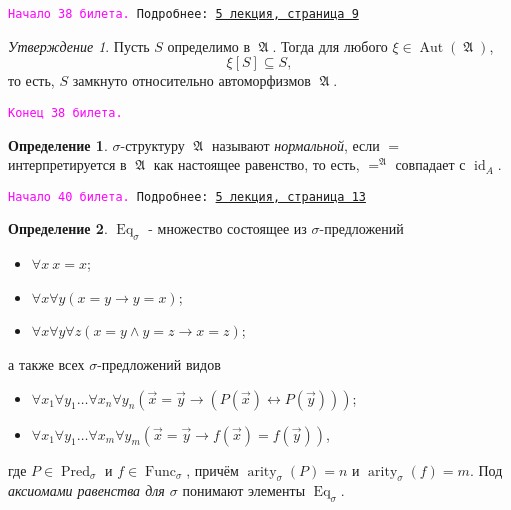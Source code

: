 \documentclass[a4paper,100pt]{article}
\theoremstyle{indented}
\theoremstyle{definition}
\newtheorem{defn}{Определение}
\theoremstyle{remark}
\newtheorem{stat}{Утверждение}
\DeclareMathOperator{\ra}{\rightarrow}
\DeclareMathOperator{\id}{id}
\DeclareMathOperator{\Pred}{Pred}
\DeclareMathOperator{\Func}{Func}
\DeclareMathOperator{\arity}{arity}
\DeclareMathOperator{\Aut}{Aut}
\DeclareMathOperator{\Eq}{Eq}
\DeclareMathOperator{\GA}{\mathfrak{A}}
\begin{document}
\hrulefill

\texttt{\hypertarget{b38}{\textcolor{magenta}{Начало 38 билета.}} Подробнее: \href{http://www.mi-ras.ru/~speranski/courses/logic-1-2021-spring/slides_5.pdf}{5 лекция, страница 9}} 

\begin{stat}
  Пусть $S$ определимо в $\GA$. Тогда для любого $\xi\in \Aut(\GA)$, 
  \[
    \xi[S]\subseteq S, 
  \]
  то есть, $S$ замкнуто относительно автоморфизмов $\GA$. 
\end{stat}

\texttt{\textcolor{magenta}{Конец 38 билета.}} 

\hrulefill

\begin{defn}
  $\sigma$-структуру $\GA$ называют \textit{нормальной}, если $=$ интерпретируется в $\GA$ как настоящее равенство, то есть, $=^{\GA}$ совпадает с $\id_A$.
\end{defn}

\hrulefill

\texttt{\hypertarget{b40}{\textcolor{magenta}{Начало 40 билета.}} Подробнее: \href{http://www.mi-ras.ru/~speranski/courses/logic-1-2021-spring/slides_5.pdf}{5 лекция, страница 13}} 

\begin{defn}
  $\Eq_\sigma$ - множество состоящее из $\sigma$-предложений

  \begin{itemize}
    \item $\forall x \: x=x$; 
    \item $\forall x \forall y (x=y\ra y=x)$; 
    \item $\forall x \forall y \forall z (x=y \wedge y=z \ra x=z)$;
  \end{itemize}
  а также всех $\sigma$-предложений видов 

  \begin{itemize}
    \item $\forall x_1 \forall y_1 \ldots \forall x_n \forall y_n (\vec{x}=\vec{y}\ra (P(\vec{x})\leftrightarrow P(\vec{y})))$; 
    \item $\forall x_1 \forall y_1 \ldots \forall x_m \forall y_m (\vec{x}=\vec{y}\ra f(\vec{x}) = f(\vec{y}))$, 
  \end{itemize}
  где $P\in \Pred_\sigma$ и $f\in \Func_\sigma$, причём $\arity_\sigma(P)=n$ и $\arity_\sigma(f)=m$. Под \textit{аксиомами равенства для $\sigma$} понимают элементы $\Eq_\sigma$. 
\end{defn}
\end{document}
